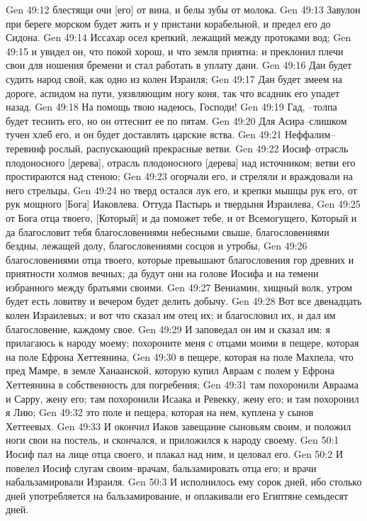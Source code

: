 Gen 49:12  блестящи очи [его] от вина, и белы зубы от молока.
Gen 49:13  Завулон при береге морском будет жить и у пристани корабельной, и предел его до Сидона.
Gen 49:14  Иссахар осел крепкий, лежащий между протоками вод;
Gen 49:15  и увидел он, что покой хорош, и что земля приятна: и преклонил плечи свои для ношения бремени и стал работать в уплату дани.
Gen 49:16  Дан будет судить народ свой, как одно из колен Израиля;
Gen 49:17  Дан будет змеем на дороге, аспидом на пути, уязвляющим ногу коня, так что всадник его упадет назад.
Gen 49:18  На помощь твою надеюсь, Господи!
Gen 49:19  Гад, --толпа будет теснить его, но он оттеснит ее по пятам.
Gen 49:20  Для Асира--слишком тучен хлеб его, и он будет доставлять царские яства.
Gen 49:21  Неффалим--теревинф рослый, распускающий прекрасные ветви.
Gen 49:22  Иосиф--отрасль плодоносного [дерева], отрасль плодоносного [дерева] над источником; ветви его простираются над стеною;
Gen 49:23  огорчали его, и стреляли и враждовали на него стрельцы,
Gen 49:24  но тверд остался лук его, и крепки мышцы рук его, от рук мощного [Бога] Иаковлева. Оттуда Пастырь и твердыня Израилева,
Gen 49:25  от Бога отца твоего, [Который] и да поможет тебе, и от Всемогущего, Который и да благословит тебя благословениями небесными свыше, благословениями бездны, лежащей долу, благословениями сосцов и утробы,
Gen 49:26  благословениями отца твоего, которые превышают благословения гор древних и приятности холмов вечных; да будут они на голове Иосифа и на темени избранного между братьями своими.
Gen 49:27  Вениамин, хищный волк, утром будет есть ловитву и вечером будет делить добычу.
Gen 49:28  Вот все двенадцать колен Израилевых; и вот что сказал им отец их; и благословил их, и дал им благословение, каждому свое.
Gen 49:29  И заповедал он им и сказал им: я прилагаюсь к народу моему; похороните меня с отцами моими в пещере, которая на поле Ефрона Хеттеянина,
Gen 49:30  в пещере, которая на поле Махпела, что пред Мамре, в земле Ханаанской, которую купил Авраам с полем у Ефрона Хеттеянина в собственность для погребения;
Gen 49:31  там похоронили Авраама и Сарру, жену его; там похоронили Исаака и Ревекку, жену его; и там похоронил я Лию;
Gen 49:32  это поле и пещера, которая на нем, куплена у сынов Хеттеевых.
Gen 49:33  И окончил Иаков завещание сыновьям своим, и положил ноги свои на постель, и скончался, и приложился к народу своему.
Gen 50:1  Иосиф пал на лице отца своего, и плакал над ним, и целовал его.
Gen 50:2  И повелел Иосиф слугам своим--врачам, бальзамировать отца его; и врачи набальзамировали Израиля.
Gen 50:3  И исполнилось ему сорок дней, ибо столько дней употребляется на бальзамирование, и оплакивали его Египтяне семьдесят дней.
